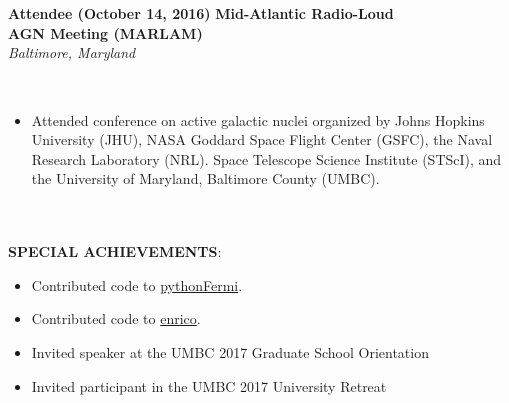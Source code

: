 \documentclass{article}
\begin{document}
\phantom \\
\phantom \\
%
%
%
%
\begin{vwcol}[widths={0.8,0.2}, sep=.8cm, justify=flush, rule=0pt, indent=0em]
\noindent \textbf{Attendee (October 14, 2016)}
\newpage
\noindent \textbf{Mid-Atlantic Radio-Loud}\\
\noindent \textbf{AGN Meeting (MARLAM)}\\
\noindent \emph{Baltimore, Maryland}
\end{vwcol}
\phantom \\
\begin{itemize}
\item Attended conference on active galactic nuclei organized by Johns Hopkins University (JHU),  NASA Goddard Space Flight Center (GSFC), the Naval Research Laboratory (NRL). Space Telescope Science Institute (STScI), and the University of Maryland, Baltimore County (UMBC).
\end{itemize}
\phantom \\
\phantom \\
%
%
%
%
\noindent \textbf{SPECIAL ACHIEVEMENTS}:
\begin{itemize}
\item Contributed code to \href{https://github.com/simonbonnefoy/pythonFermi}{pythonFermi}.
\item Contributed code to \href{https://github.com/gammapy/enrico}{enrico}.
\item Invited speaker at the UMBC 2017 Graduate School Orientation
\item Invited participant in the UMBC 2017 University Retreat
\end{itemize}
\phantom \\
%
%
%
%
%
%
\end{document}
